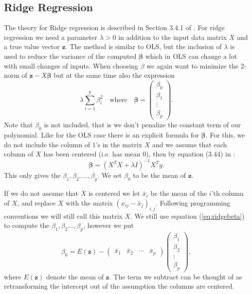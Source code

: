 \documentclass[parskip=half]{scrartcl}
\theoremstyle{definition}
\theoremstyle{remark}
\newcommand{\vect}[1]{{\bm{#1}}}
\begin{document}
\subsection{Ridge Regression}  

The theory for Ridge regression is described in Section 3.4.1 of \cite{htf:esl}. 
For ridge regression we need a parameter $\lambda > 0$ in addition to the input data matrix $X$ and a true value vector $\vect{z}$.
The method is similar to OLS, but the inclusion of $\lambda$ is used to reduce the variance of the computed $\vect{\beta}$ which in OLS can change a lot with small changes of inputs.    
When choosing $\beta$ we again want to minimize the 2-norm of $\vect{z} - X\vect{\beta}$ but at the same time also the expression 
\[
	\lambda \sum_{i=1}^p \beta_i^2 \quad \text{where} \quad  \vect{\beta} = \begin{pmatrix}\beta_0 \\ \beta_1 \\ \vdots \\ \beta_p \end{pmatrix}.	     
\]
Note that $\beta_0$ is not included, that is we don't penalize the constant term of our polynomial. 
Like for the OLS case there is an explicit formula for $\vect{\beta}$.
For this, we do not include the column of $1$'s in the matrix $X$ and we assume that each column of $X$ has been centered (i.e. has mean $0$), then by equation (3.44) in \cite{htf:esl}:
\begin{equation} \label{eq:ridgebeta}
	\vect{\beta} = \left(X^T X + \lambda I \right)^{-1} X^T y. 
\end{equation}
This only gives the $\beta_1, \beta_2, \ldots, \beta_p$. 
We set $\beta_0$ to be the mean of $\vect{z}$.

If we do not assume that $X$ is centered we let $\bar{x}_i$ be the mean of the $i$'th column of $X$, and replace $X$ with the matrix $(x_{ij} - \bar{x}_j)_{i,j}$. 
Following programming conventions we will still call this matrix $X$.
We still use equation (\ref{eq:ridgebeta}) to compute the $\beta_1, \beta_2 \ldots, \beta_p$, however we put
\begin{equation} \label{eq:ridgeintercept}
	\beta_0 = E(\vect{z}) - \begin{pmatrix} \bar{x}_1 & \bar{x}_2 & \cdots & \bar{x}_p \end{pmatrix} \begin{pmatrix} \beta_1 \\ \beta_2 \\ \vdots \\ \beta_p \end{pmatrix},
\end{equation}
where $E(\vect{z})$ denote the mean of $\vect{z}$. 
The term we subtract can be thought of as retransforming the intercept out of the assumption the columns are centered. 
\end{document}
